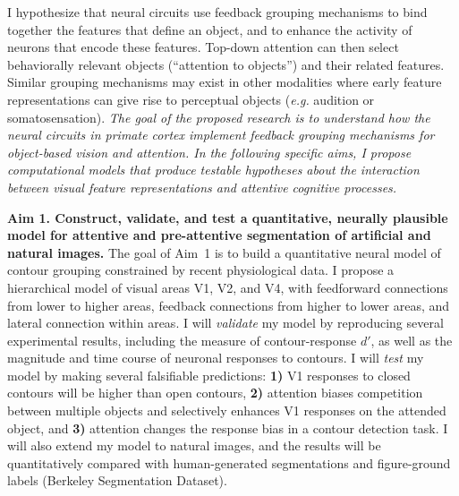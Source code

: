 \documentclass[11pt]{article}
\newcommand{\eg}[0]{{\em e.g.}\xspace}
\begin{document}
I hypothesize 
that neural circuits
use feedback grouping mechanisms to bind together the features that define an
object, and to enhance the activity of neurons that encode these
features.
Top-down attention can then select
behaviorally relevant objects (``attention to objects'')
and their related features.
Similar grouping
mechanisms may exist in other modalities where early feature
representations can give rise to perceptual objects (\eg audition or
somatosensation).
%
 {\em The goal of the proposed research is to
  understand how the neural circuits in primate cortex implement
  feedback grouping mechanisms for
  object-based vision and attention. In the following specific aims, I
  propose computational models that produce testable hypotheses about
  the interaction between visual feature representations and attentive
  cognitive processes.}

\bigskip

\textbf{\large Aim 1. Construct, validate, and test a quantitative,
  neurally plausible model for attentive and pre-attentive
  segmentation of artificial and natural images.} The goal of Aim~1 is
to build a quantitative neural model of contour grouping constrained
by recent physiological data. I propose a hierarchical model of visual
areas V1, V2, and V4, with feedforward connections from lower to
higher areas, feedback connections from higher to lower areas, and
lateral connection within areas. I will {\em validate} my model by
reproducing several experimental results, including the measure of
contour-response $d'$, as well as the magnitude and time course of
neuronal responses to contours. I will {\em test} my model by making
several falsifiable predictions: \textbf{1)} V1 responses to closed
contours will be higher than open contours, \textbf{2)} attention
biases competition between multiple objects and selectively enhances
V1 responses on the attended object, and \textbf{3)} attention changes
the response bias in a contour detection task.  I will also extend my
model to natural images, and the results will be quantitatively
compared with human-generated segmentations and figure-ground labels
(Berkeley Segmentation Dataset).
\end{document}
